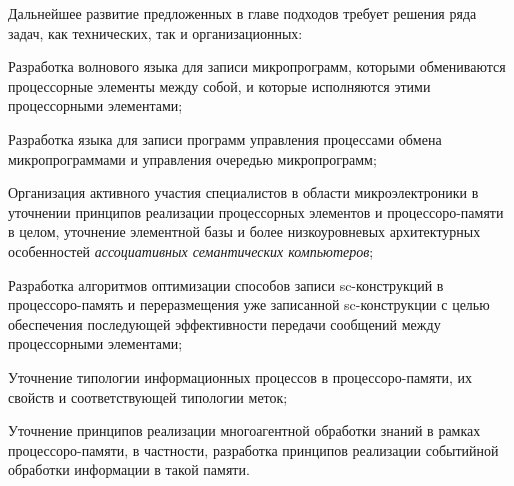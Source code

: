 Дальнейшее развитие предложенных в главе подходов требует решения ряда задач, как технических, так и организационных:
\begin{textitemize}
	\item Разработка волнового языка для записи микропрограмм, которыми обмениваются процессорные элементы между собой, и которые исполняются этими процессорными элементами;
	\item Разработка языка для записи программ управления процессами обмена микропрограммами и управления очередью микропрограмм;
	\item Организация активного участия специалистов в области микроэлектроники в уточнении принципов реализации процессорных элементов и процессоро-памяти в целом, уточнение элементной базы и более низкоуровневых архитектурных особенностей \textit{ассоциативных семантических компьютеров};
	\item Разработка алгоритмов оптимизации способов записи sc-конструкций в процессоро-память и переразмещения уже записанной sc-конструкции с целью обеспечения последующей эффективности передачи сообщений между процессорными элементами;
	\item Уточнение типологии информационных процессов в процессоро-памяти, их свойств и соответствующей типологии меток;
	\item Уточнение принципов реализации многоагентной обработки знаний в рамках процессоро-памяти, в частности, разработка принципов реализации событийной обработки информации в такой памяти.
\end{textitemize}
